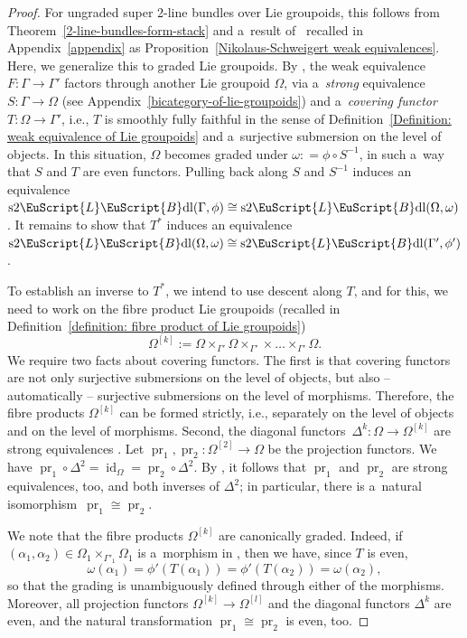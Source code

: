 \documentclass[pdftex]{sigma}
\numberwithin{equation}{section}
\def\mathscr#1{\EuScript{#1}}
\newcommand{\pr}{\operatorname{pr}}
\newcommand{\id}{\operatorname{id}}
\newcommand{\LineBdl}{\mathscr{L}\mathscr{B}\mathrm{dl}}
\newcommand{\stwoLineBdl}{\mathrm{s}2\LineBdl}
\begin{document}
\begin{proof}
For ungraded super 2-line bundles over Lie groupoids, this follows from Theorem~\ref{2-line-bundles-form-stack} and a~result of~\cite{nikolaus2} recalled in Appendix~\ref{appendix} as Proposition~\ref{Nikolaus-Schweigert weak equivalences}. Here, we generalize this to graded Lie groupoids.
By \cite[Proposition~5.7]{nikolaus2}, the weak equivalence $F\colon \Gamma \to \Gamma'$ factors through another Lie groupoid $\Omega$, via a~\emph{strong} equivalence $S\colon \Gamma \to \Omega$ (see Appendix~\ref{bicategory-of-lie-groupoids}) and a~\emph{covering functor} $T\colon \Omega \to \Gamma'$, i.e., $T$ is smoothly fully faithful in the sense of Definition~\ref{Definition: weak equivalence of Lie groupoids} and a~surjective submersion on the level of objects. In this situation, $\Omega$ becomes graded under $\omega: =\phi \circ S^{-1}$, in such a~way that $S$ and $T$ are even functors. Pulling back along $S$ and $S^{-1}$ induces an equivalence $\stwoLineBdl(\Gamma, \phi) \cong \stwoLineBdl(\Omega,\omega)$. It remains to show that $T^{*}$ induces an equivalence~${\stwoLineBdl(\Omega,\omega)\cong \stwoLineBdl(\Gamma',\phi')}$.




To establish an inverse to $T^{*}$, we intend to use descent along $T$, and for this, we need to work on the fibre product Lie groupoids (recalled in Definition~\ref{definition: fibre product of Lie groupoids})
\begin{equation*}
\Omega^{[k]} := \Omega \times_{\Gamma'} \Omega \times_{\Gamma'} \times\dots\times_{\Gamma'} \Omega.
\end{equation*}
We require two
facts about covering functors. The first is that covering functors are not only surjective submersions on the level of objects, but also -- automatically -- surjective submersions on the level of morphisms. Therefore, the fibre products $\Omega^{[k]}$ can be formed strictly, i.e., separately on the level of objects and on the level of morphisms. Second, the diagonal functors~${
\Delta^{k}\colon \Omega \to \Omega^{[k]}}
$
are strong equivalences \cite[Lemma~8.1\,(ii)]{nikolaus2}. Let $\pr_1,\pr_2\colon \Omega^{[2]} \to \Omega$ be the projection functors. We have $\pr_1\circ\Delta^2 = \id_{\Omega} = \pr_2\circ \Delta^2$. By \cite[Lemma~5.3]{nikolaus2}, it follows that $\pr_1$ and $\pr_2$ are strong equivalences, too, and both inverses of $\Delta^2$; in particular, there is a~natural isomorphism~${\pr_1\cong \pr_2}$.

We note that the fibre products $\Omega^{[k]}$ are canonically graded. Indeed, if $(\alpha_1,\alpha_2)\in \Omega_1 \times_{\Gamma'_1}\Omega_1$ is a~morphism in \smash{$\Omega^{[2]}$}, then we have, since $T$ is even,
\begin{equation*}
\omega(\alpha_1) = \phi'(T(\alpha_1))=\phi'(T(\alpha_2))=\omega(\alpha_2),
\end{equation*}
so that the grading is unambiguously defined through either of the morphisms. Moreover, all projection functors $\Omega^{[k]} \to \Omega^{[l]}$ and the diagonal functors $\Delta^{k}$ are even, and the natural transformation $\pr_1\cong \pr_2$ is even, too.


\end{proof}
\end{document}
